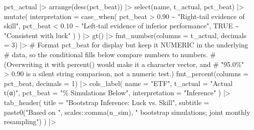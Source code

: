 \documentclass[
  letterpaper,
  DIV=11,
  numbers=noendperiod]{scrartcl}
\newenvironment{Shaded}{\begin{snugshade}}{\end{snugshade}}
\newcommand{\AttributeTok}[1]{\textcolor[rgb]{0.40,0.45,0.13}{#1}}
\newcommand{\CommentTok}[1]{\textcolor[rgb]{0.37,0.37,0.37}{#1}}
\newcommand{\ConstantTok}[1]{\textcolor[rgb]{0.56,0.35,0.01}{#1}}
\newcommand{\DecValTok}[1]{\textcolor[rgb]{0.68,0.00,0.00}{#1}}
\newcommand{\FloatTok}[1]{\textcolor[rgb]{0.68,0.00,0.00}{#1}}
\newcommand{\FunctionTok}[1]{\textcolor[rgb]{0.28,0.35,0.67}{#1}}
\newcommand{\NormalTok}[1]{\textcolor[rgb]{0.00,0.23,0.31}{#1}}
\newcommand{\SpecialCharTok}[1]{\textcolor[rgb]{0.37,0.37,0.37}{#1}}
\newcommand{\StringTok}[1]{\textcolor[rgb]{0.13,0.47,0.30}{#1}}
\begin{document}
\begin{Shaded}
\begin{Highlighting}[]
\NormalTok{pct\_actual }\SpecialCharTok{|\textgreater{}}
  \FunctionTok{arrange}\NormalTok{(}\FunctionTok{desc}\NormalTok{(pct\_beat)) }\SpecialCharTok{|\textgreater{}}
  \FunctionTok{select}\NormalTok{(name, t\_actual, pct\_beat) }\SpecialCharTok{|\textgreater{}}
  \FunctionTok{mutate}\NormalTok{(}
    \AttributeTok{interpretation =} \FunctionTok{case\_when}\NormalTok{(}
\NormalTok{      pct\_beat }\SpecialCharTok{\textgreater{}} \FloatTok{0.90} \SpecialCharTok{\textasciitilde{}} \StringTok{"Right{-}tail evidence of skill"}\NormalTok{,}
\NormalTok{      pct\_beat }\SpecialCharTok{\textless{}} \FloatTok{0.10} \SpecialCharTok{\textasciitilde{}} \StringTok{"Left{-}tail evidence of inferior performance"}\NormalTok{,}
      \ConstantTok{TRUE}            \SpecialCharTok{\textasciitilde{}} \StringTok{"Consistent with luck"}
\NormalTok{    )}
\NormalTok{  ) }\SpecialCharTok{|\textgreater{}}
  \FunctionTok{gt}\NormalTok{() }\SpecialCharTok{|\textgreater{}}
  \FunctionTok{fmt\_number}\NormalTok{(}\AttributeTok{columns =}\NormalTok{ t\_actual, }\AttributeTok{decimals =} \DecValTok{3}\NormalTok{) }\SpecialCharTok{|\textgreater{}}
  \CommentTok{\# Format pct\_beat for display but keep it NUMERIC in the underlying}
  \CommentTok{\# data, so the conditional fills below compare numbers to numbers.}
  \CommentTok{\# (Overwriting it with percent() would make it a character vector, and}
  \CommentTok{\#  "95.0\%" \textgreater{} 0.90 is a silent string comparison, not a numeric test.)}
  \FunctionTok{fmt\_percent}\NormalTok{(}\AttributeTok{columns =}\NormalTok{ pct\_beat, }\AttributeTok{decimals =} \DecValTok{1}\NormalTok{) }\SpecialCharTok{|\textgreater{}}
  \FunctionTok{cols\_label}\NormalTok{(}
    \AttributeTok{name           =} \StringTok{"ETF"}\NormalTok{,}
    \AttributeTok{t\_actual       =} \StringTok{"Actual t(α)"}\NormalTok{,}
    \AttributeTok{pct\_beat       =} \StringTok{"\% Simulations Below"}\NormalTok{,}
    \AttributeTok{interpretation =} \StringTok{"Inference"}
\NormalTok{  ) }\SpecialCharTok{|\textgreater{}}
  \FunctionTok{tab\_header}\NormalTok{(}
    \AttributeTok{title    =} \StringTok{"Bootstrap Inference: Luck vs. Skill"}\NormalTok{,}
    \AttributeTok{subtitle =} \FunctionTok{paste0}\NormalTok{(}\StringTok{"Based on "}\NormalTok{, scales}\SpecialCharTok{::}\FunctionTok{comma}\NormalTok{(n\_sim),}
                      \StringTok{" bootstrap simulations; joint monthly resampling"}\NormalTok{)}
\NormalTok{  ) }\SpecialCharTok{|\textgreater{}}

\end{Highlighting}
\end{Shaded}
\end{document}
